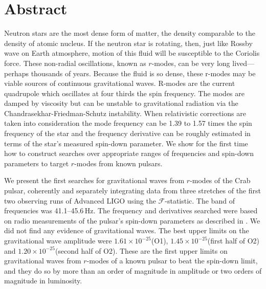 \documentclass{ttuthes2007}
\begin{document}
\chapter{\textbf{Abstract}}
Neutron stars are the most dense form of matter, the density comparable to the
density of atomic nucleus.  If the neutron star is rotating, then, just like
Rossby wave on Earth atmosphere, motion of this fluid will be susceptible to the
Coriolis force. These non-radial oscillations, known as $r$-modes, can be very
long lived---perhaps thousands of years. Because the fluid is so dense, these
r-modes may be viable sources of continuous gravitational waves.  R-modes are
the current quadrupole which oscillates at four thirds the spin frequency. The
modes are damped by viscosity but can be unstable to gravitational radiation via
the Chandrasekhar-Friedman-Schutz instability. When relativistic corrections are
taken into consideration the mode frequency can be 1.39 to 1.57 times the spin
frequency of the star and the frequency derivative can be roughly estimated in
terms of the star's measured spin-down parameter. We show for the first time how
to construct searches over appropriate ranges of frequencies and spin-down
parameters to target $r$-modes from known pulsars. 

We present the first searches for gravitational waves from
$r$-modes of the Crab pulsar, coherently and separately integrating data from
three stretches of the first two observing runs of Advanced LIGO using the
$\mathcal{F}$-statistic. The band of frequencies was 41.1--45.6\,Hz.  The
frequency and derivatives searched were based on radio measurements of the
pulsar's spin-down parameters  as described in \citet{PhysRevD.100.064013}.  We
did not find any evidence of gravitational waves. The best upper limits on the
gravitational wave amplitude  were $1.61\times10^{-25}$(O1), $1.45\times10^{-25}
$(first half of O2) and $1.20\times10^{-25} $(second half of O2). These are the
first upper  limits on gravitational waves from $r$-modes of a known pulsar to
beat the spin-down limit, and they do so by more than an order of magnitude
in amplitude or two orders of magnitude in luminosity.  


\listoftables	%
\end{document}
